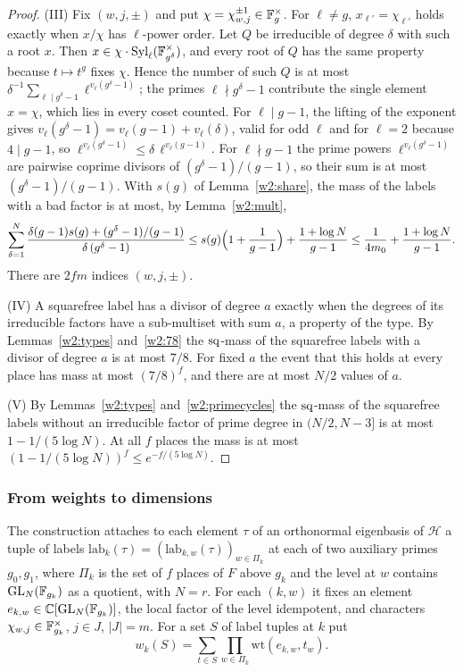 \begin{proof}
(III) Fix $(w,j,\pm)$ and put $\chi=\chi_{w,j}^{\pm1}\in\mathbb F_g^\times$. For $\ell\ne g$, $x_{\ell'}=\chi_{\ell'}$ holds exactly when $x/\chi$ has $\ell$-power order. Let $Q$ be irreducible of degree $\delta$ with such a root $x$. Then $x\in\chi\cdot\operatorname{Syl}_\ell(\mathbb F_{g^\delta}^\times)$, and every root of $Q$ has the same property because $t\mapsto t^g$ fixes $\chi$. Hence the number of such $Q$ is at most $\delta^{-1}\sum_{\ell\mid g^\delta-1}\ell^{v_\ell(g^\delta-1)}$; the primes $\ell\nmid g^\delta-1$ contribute the single element $x=\chi$, which lies in every coset counted. For $\ell\mid g-1$, the lifting of the exponent gives $v_\ell(g^\delta-1)=v_\ell(g-1)+v_\ell(\delta)$, valid for odd $\ell$ and for $\ell=2$ because $4\mid g-1$, so $\ell^{v_\ell(g^\delta-1)}\le\delta\,\ell^{v_\ell(g-1)}$. For $\ell\nmid g-1$ the prime powers $\ell^{v_\ell(g^\delta-1)}$ are pairwise coprime divisors of $(g^\delta-1)/(g-1)$, so their sum is at most $(g^\delta-1)/(g-1)$. With $s(g)$ of Lemma~\ref{w2:share}, the mass of the labels with a bad factor is at most, by Lemma~\ref{w2:mult},
\[
\sum_{\delta=1}^N\frac{\delta(g-1)s(g)+(g^\delta-1)/(g-1)}{\delta\,(g^\delta-1)}\le s(g)\Bigl(1+\frac1{g-1}\Bigr)+\frac{1+\log N}{g-1}\le\frac1{4m_0}+\frac{1+\log N}{g-1}.
\]
There are $2fm$ indices $(w,j,\pm)$.

(IV) A squarefree label has a divisor of degree $a$ exactly when the degrees of its irreducible factors have a sub-multiset with sum $a$, a property of the type. By Lemmas~\ref{w2:types} and~\ref{w2:78} the $\mathrm{sq}$-mass of the squarefree labels with a divisor of degree $a$ is at most $7/8$. For fixed $a$ the event that this holds at every place has mass at most $(7/8)^f$, and there are at most $N/2$ values of $a$.

(V) By Lemmas~\ref{w2:types} and~\ref{w2:primecycles} the $\mathrm{sq}$-mass of the squarefree labels without an irreducible factor of prime degree in $(N/2,N-3]$ is at most $1-1/(5\log N)$. At all $f$ places the mass is at most $(1-1/(5\log N))^f\le e^{-f/(5\log N)}$.
\end{proof}

\subsubsection{From weights to dimensions}

The construction attaches to each element $\tau$ of an orthonormal eigenbasis of $\mathcal H$ a tuple of labels $\mathrm{lab}_k(\tau)=(\mathrm{lab}_{k,w}(\tau))_{w\in\Pi_k}$ at each of two auxiliary primes $g_0,g_1$, where $\Pi_k$ is the set of $f$ places of $F$ above $g_k$ and the level at $w$ contains $\mathrm{GL}_N(\mathbb F_{g_k})$ as a quotient, with $N=r$. For each $(k,w)$ it fixes an element $e_{k,w}\in\mathbb C[\mathrm{GL}_N(\mathbb F_{g_k})]$, the local factor of the level idempotent, and characters $\chi_{w,j}\in\mathbb F_{g_k}^\times$, $j\in J$, $|J|=m$. For a set $S$ of label tuples at $k$ put
\[
w_k(S)=\sum_{t\in S}\prod_{w\in\Pi_k}\mathrm{wt}(e_{k,w},t_w).
\]

